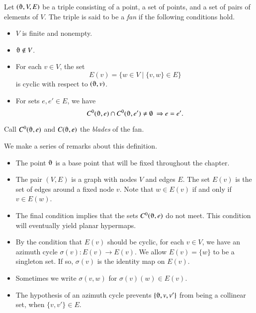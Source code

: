\begin{definition}  Let $(\orgn,V,E)$ be a triple consisting of a point,
a set of
points, and a set of pairs of elements of $V$.  The triple is said to be
a {\it fan\/} if the following conditions hold.
    \begin{itemize}
    \item $V$ is finite and nonempty.
    \item $\orgn\not\in V$.
    \item For each $v\in V$, the set
        $$
        E(v) = \{w\in V\mid \{v,w\}\in E\}
        $$
        is cyclic with respect to $(\orgn,v)$.
    \item For sets $e,e'\in E$,   we have
        $$C^0(\orgn,e) \cap C^0(\orgn,e')\ne\emptyset\ \Rightarrow e = e'.$$
    \end{itemize}
Call $C^0(\orgn,e)$ and $C(\orgn,e)$ the {\it blades\/} of the fan.
\end{definition}

We make a series of remarks about this definition.

\begin{remark}
\begin{itemize}
\item The point $\orgn$ is a base point that will be fixed throughout
the chapter.  
\item The pair $(V,E)$ is a graph with nodes $V$ and edges $E$.  The set
$E(v)$ is the set of edges around a fixed node $v$.
Note that $w\in E(v)$ if and only if $v\in E(w)$.   
%
\item The final condition implies that the sets $C^0(\orgn,e)$
do not meet.   This condition will eventually yield planar
hypermaps.
%
\item
By the condition that $E(v)$ should be cyclic,
for each $v\in V$, we have an azimuth cycle $\sigma(v):E(v)\to E(v)$.
We allow $E(v) = \{w\}$ to be a
singleton set. If so,
$\sigma(v)$ is the identity map on $E(v)$.
%
\item
Sometimes we write $\sigma(v,w)$ for $\sigma(v)(w)\in E(v)$.
%
\item 
The hypothesis of an azimuth cycle
prevents $\{\orgn,v,v'\}$ from being a collinear set, when $\{v,v'\}\in
E$.
%
\end{itemize}
\end{remark}



